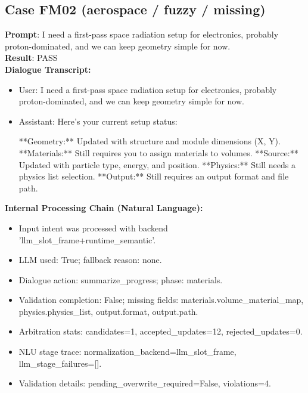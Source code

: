 \documentclass[11pt]{ctexart}
\begin{document}
\subsection{Case FM02 (aerospace / fuzzy / missing)}
\textbf{Prompt}: I need a first-pass space radiation setup for electronics, probably proton-dominated, and we can keep geometry simple for now.\\
\textbf{Result}: PASS\\
\textbf{Dialogue Transcript:}
\begin{itemize}
\item User: I need a first-pass space radiation setup for electronics, probably proton-dominated, and we can keep geometry simple for now.
\item Assistant: Here's your current setup status:

**Geometry:** Updated with structure and module dimensions (X, Y).
**Materials:** Still requires you to assign materials to volumes.
**Source:** Updated with particle type, energy, and position.
**Physics:** Still needs a physics list selection.
**Output:** Still requires an output format and file path.
\end{itemize}
\textbf{Internal Processing Chain (Natural Language):}
\begin{itemize}
\item Input intent was processed with backend 'llm\_slot\_frame+runtime\_semantic'.
\item LLM used: True; fallback reason: none.
\item Dialogue action: summarize\_progress; phase: materials.
\item Validation completion: False; missing fields: materials.volume\_material\_map, physics.physics\_list, output.format, output.path.
\item Arbitration stats: candidates=1, accepted\_updates=12, rejected\_updates=0.
\item NLU stage trace: normalization\_backend=llm\_slot\_frame, llm\_stage\_failures=[].
\item Validation details: pending\_overwrite\_required=False, violations=4.
\end{itemize}
\end{document}
